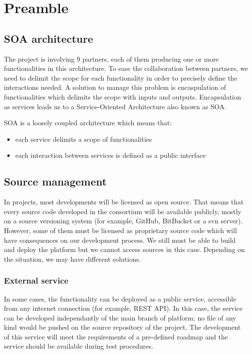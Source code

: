 \chapter{Preamble}
\label{ch:preamble}

\section{SOA architecture}
\label{sec:soa-architecture}

The \learnpad project is involving 9 partners, each of them producing one or more functionalities in this architecture.
To ease the collaboration between partners, we need to delimit the scope for each functionality in order to precisely define the interactions needed.
A solution to manage this problem is encaspulation of functionalities which delimits the scope with inputs and outputs.
Encapsulation as services leads us to a Service-Oriented Architecture also known as SOA.

SOA is a loosely coupled architecture which means that:
\begin{itemize}
	\item each service delimits a scope of functionalities
	\item each interaction between services is defined as a public interface
\end{itemize}

\section{Source management}
\label{sec:source-management}

In \learnpad projects, most developments will be licensed as open source.
That means that every source code developed in the consortium will be available publicly, mostly on a source versioning system (for example, GitHub, BitBucket or a svn server).
However, some of them must be licensed as proprietary source code which will have consequences on our development process.
We still must be able to build and deploy the \learnpad platform but we cannot access sources in this case.
Depending on the situation, we may have different solutions.

\subsection{External service}
\label{sec:external-service}

In some cases, the functionality can be deployed as a public service, accessible from any internet connection (for example, REST API).
In this case, the service can be developed independantly of the main branch of \learnpad platform; no file of any kind would be pushed on the source repository of the \learnpad project.
The development of this service will meet the requirements of a pre-defined roadmap and the service should be available during test procedures.

